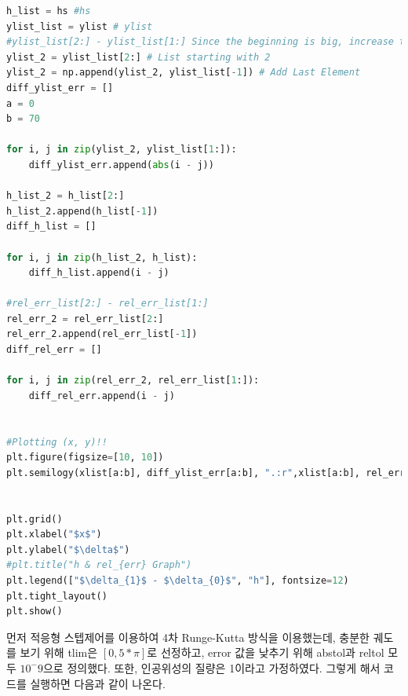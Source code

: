 \documentclass[11pt]{article}
\begin{document}
\begin{lstlisting}[language=Python]
h_list = hs #hs 
ylist_list = ylist # ylist 
#ylist_list[2:] - ylist_list[1:] Since the beginning is big, increase the same value.
ylist_2 = ylist_list[2:] # List starting with 2
ylist_2 = np.append(ylist_2, ylist_list[-1]) # Add Last Element
diff_ylist_err = []
a = 0
b = 70

for i, j in zip(ylist_2, ylist_list[1:]):
    diff_ylist_err.append(abs(i - j))

h_list_2 = h_list[2:]
h_list_2.append(h_list[-1])
diff_h_list = []

for i, j in zip(h_list_2, h_list):
    diff_h_list.append(i - j)
    
#rel_err_list[2:] - rel_err_list[1:] 
rel_err_2 = rel_err_list[2:] 
rel_err_2.append(rel_err_list[-1]) 
diff_rel_err = []

for i, j in zip(rel_err_2, rel_err_list[1:]):
    diff_rel_err.append(i - j)

    
#Plotting (x, y)!!
plt.figure(figsize=[10, 10])
plt.semilogy(xlist[a:b], diff_ylist_err[a:b], ".:r",xlist[a:b], rel_err_list[a:b], ".:b")


plt.grid()
plt.xlabel("$x$")
plt.ylabel("$\delta$")
#plt.title("h & rel_{err} Graph")
plt.legend(["$\delta_{1}$ - $\delta_{0}$", "h"], fontsize=12)
plt.tight_layout()
plt.show()
\end{lstlisting}
먼저 적응형 스텝제어를 이용하여 4차 Runge-Kutta 방식을 이용했는데, 
충분한 궤도를 보기 위해 tlim은 $[0, 5 * \pi]$로 선정하고, error 값을 낮추기 위해 abstol과 reltol 모두 $10^-9$으로 정의했다. 또한, 인공위성의 질량은 1이라고 가정하였다. 그렇게 해서 코드를 실행하면 다음과 같이 나온다.
\end{document}
